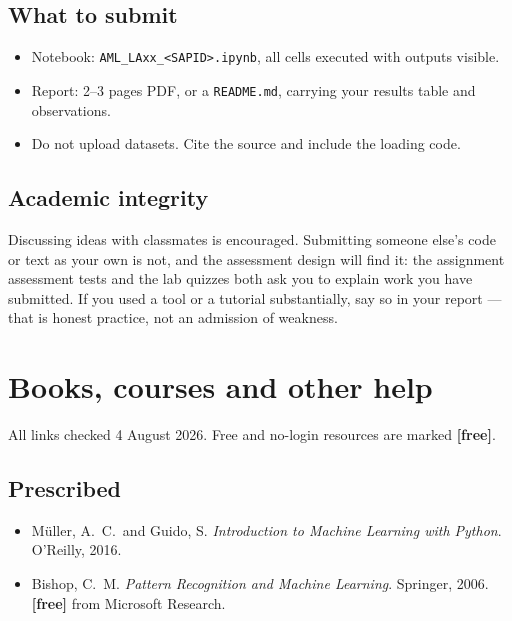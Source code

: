 \documentclass[11pt]{article}
\begin{document}
\subsection{What to submit}

\begin{itemize}[leftmargin=*]
  \item Notebook: \texttt{AML\_LAxx\_<SAPID>.ipynb}, all cells executed with
    outputs visible.
  \item Report: 2--3 pages PDF, or a \texttt{README.md}, carrying your results
    table and observations.
  \item Do not upload datasets. Cite the source and include the loading code.
\end{itemize}

\subsection{Academic integrity}

Discussing ideas with classmates is encouraged. Submitting someone else's code
or text as your own is not, and the assessment design will find it: the
assignment assessment tests and the lab quizzes both ask you to explain work you
have submitted. If you used a tool or a tutorial substantially, say so in your
report --- that is honest practice, not an admission of weakness.

\newpage
\section{Books, courses and other help}

All links checked 4 August 2026. Free and no-login resources are marked
\textbf{[free]}.

\subsection*{Prescribed}

\begin{itemize}[leftmargin=*]
  \item M\"uller, A.\ C.\ and Guido, S. \emph{Introduction to Machine Learning
    with Python}. O'Reilly, 2016.
  \item Bishop, C.\ M. \emph{Pattern Recognition and Machine Learning}.
    Springer, 2006. \textbf{[free]} from Microsoft Research.
\end{itemize}
\end{document}
